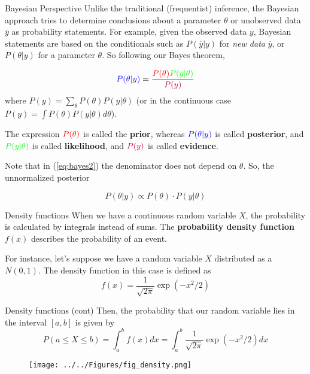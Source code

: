 \documentclass{beamer}
\begin{document}
\begin{frame}{Bayesian Perspective}
	Unlike the traditional (frequentist) inference, the Bayesian approach tries to determine conclusions about a parameter $\theta$ or unobserved data $\overline{y}$ as probability statements.  For example, given the observed data $y$,  Bayesian statements are based on the conditionals such as  $P(\overline{y}|y)$ for {\it new data} $\overline{y}$, or $P(\theta|y)$ for a parameter $\theta$. So following our Bayes theorem,
	
	\begin{equation}
		{\color{blue}P(\theta| y)}=\frac{{\color{red} P(\theta)} {\color{green}P(y|\theta)}}{\color{purple}P(y)}
		\label{eq:bayes2}
	\end{equation}
where $P(y)= \sum_{\theta} P(\theta) P(y|\theta)$ (or in the continuous case $P(y)= \int P(\theta) P(y|\theta) d\theta$). 

The expression  $\color{red} P(\theta)$ is called the {\bf prior}, whereas  $\color{blue} P(\theta|y)$  is called {\bf posterior}, and $\color{green}P(y|\theta)$ is called {\bf likelihood}, and $\color{purple}P(y)$ is called {\bf evidence}. 

Note that in (\ref{eq:bayes2}) the denominator does not depend on $\theta$.  So, the unnormalized posterior 

\begin{equation*}
	P(\theta|y) \propto P(\theta) \cdot P(y|\theta)
\end{equation*}

 
\end{frame}

\begin{frame}{Density functions}
	When we have a continuous random variable $X$, the probability is calculated by integrals instead of sums. The {\bf probability density function} $f(x)$ describes the probability of an event. 
	
	For instance, let's suppose we have a random variable $X$ distributed as a $N(0,1)$. The density function in this case is defined as
	\begin{equation*}
		f(x)= \frac{1}{\sqrt{2\pi}} \exp(-x^2/2)
	\end{equation*}
	
\end{frame}
\begin{frame}{Density functions (cont)}
Then, the probability that our random variable lies in the interval  $[a,b]$ is given by
\begin{equation*}
		P(a \le X \le b)= \int_a^b f(x)dx = \int_a^b  \frac{1}{\sqrt{2\pi}} \exp(-x^2/2) dx
\end{equation*}
 \begin{figure}[h]
	\centering
	\texttt{[image: ../../Figures/fig\_density.png]}
\end{figure}

\end{frame}
\end{document}
